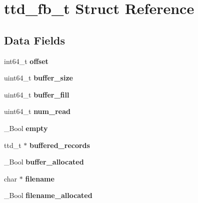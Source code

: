 \hypertarget{structttd__fb__t}{}\section{ttd\+\_\+fb\+\_\+t Struct Reference}
\label{structttd__fb__t}
\subsection*{Data Fields}
\begin{DoxyCompactItemize}
\item 
\hypertarget{structttd__fb__t_af0c9ee86a72d3c03c9214e7129895fca}{}int64\+\_\+t {\bfseries offset}\label{structttd__fb__t_af0c9ee86a72d3c03c9214e7129895fca}

\item 
\hypertarget{structttd__fb__t_a79324b50653f8fe099da43b5dcc0a736}{}uint64\+\_\+t {\bfseries buffer\+\_\+size}\label{structttd__fb__t_a79324b50653f8fe099da43b5dcc0a736}

\item 
\hypertarget{structttd__fb__t_aba6d4afce544bffde3b3f6b64bb5d06e}{}uint64\+\_\+t {\bfseries buffer\+\_\+fill}\label{structttd__fb__t_aba6d4afce544bffde3b3f6b64bb5d06e}

\item 
\hypertarget{structttd__fb__t_a8a64fe5aaada1aaefe6c3a7da6138d55}{}uint64\+\_\+t {\bfseries num\+\_\+read}\label{structttd__fb__t_a8a64fe5aaada1aaefe6c3a7da6138d55}

\item 
\hypertarget{structttd__fb__t_a92bffd35b453054e62d8fc2cf9378480}{}\+\_\+\+Bool {\bfseries empty}\label{structttd__fb__t_a92bffd35b453054e62d8fc2cf9378480}

\item 
\hypertarget{structttd__fb__t_a1761da2b50bdca2e2be9387fd55e9576}{}ttd\+\_\+t $\ast$ {\bfseries buffered\+\_\+records}\label{structttd__fb__t_a1761da2b50bdca2e2be9387fd55e9576}

\item 
\hypertarget{structttd__fb__t_afa9dcf0168d01a0725df47cd7b6ff505}{}\+\_\+\+Bool {\bfseries buffer\+\_\+allocated}\label{structttd__fb__t_afa9dcf0168d01a0725df47cd7b6ff505}

\item 
\hypertarget{structttd__fb__t_ad7c2ed7eb26cb8710696bae3b0c865ff}{}char $\ast$ {\bfseries filename}\label{structttd__fb__t_ad7c2ed7eb26cb8710696bae3b0c865ff}

\item 
\hypertarget{structttd__fb__t_ad41b0e57286c675edc3d1cabd52329cc}{}\+\_\+\+Bool {\bfseries filename\+\_\+allocated}\label{structttd__fb__t_ad41b0e57286c675edc3d1cabd52329cc}


\end{DoxyCompactItemize}
